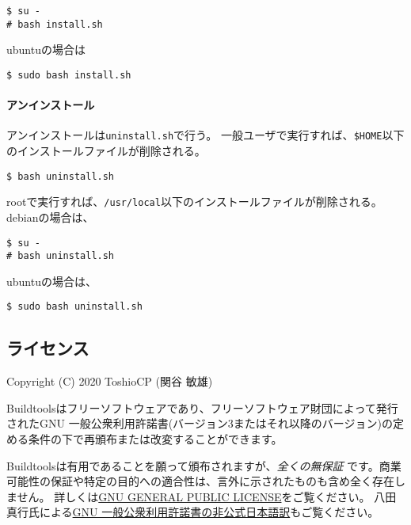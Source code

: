 \begin{verbatim}
$ su -
# bash install.sh
\end{verbatim}

ubuntuの場合は

\begin{verbatim}
$ sudo bash install.sh
\end{verbatim}

\hypertarget{ux30a2ux30f3ux30a4ux30f3ux30b9ux30c8ux30fcux30eb}{%
\paragraph{アンインストール}\label{ux30a2ux30f3ux30a4ux30f3ux30b9ux30c8ux30fcux30eb}}

アンインストールは\texttt{uninstall.sh}で行う。
一般ユーザで実行すれば、\texttt{\$HOME}以下のインストールファイルが削除される。

\begin{verbatim}
$ bash uninstall.sh
\end{verbatim}

rootで実行すれば、\texttt{/usr/local}以下のインストールファイルが削除される。
debianの場合は、

\begin{verbatim}
$ su -
# bash uninstall.sh
\end{verbatim}

ubuntuの場合は、

\begin{verbatim}
$ sudo bash uninstall.sh
\end{verbatim}

\hypertarget{ux30e9ux30a4ux30bbux30f3ux30b9}{%
\subsection{ライセンス}\label{ux30e9ux30a4ux30bbux30f3ux30b9}}

Copyright (C) 2020 ToshioCP (関谷 敏雄)

Buildtoolsはフリーソフトウェアであり、フリーソフトウェア財団によって発行されたGNU
一般公衆利用許諾書(バージョン3またはそれ以降のバージョン)の定める条件の下で再頒布または改変することができます。

Buildtoolsは有用であることを願って頒布されますが、\emph{全くの無保証}
です。商業可能性の保証や特定の目的への適合性は、言外に示されたものも含め全く存在しません。
詳しくは\href{https://www.gnu.org/licenses/gpl-3.0.html}{GNU GENERAL
PUBLIC LICENSE}をご覧ください。
八田真行氏による\href{https://gpl.mhatta.org/gpl.ja.html}{GNU
一般公衆利用許諾書の非公式日本語訳}もご覧ください。
